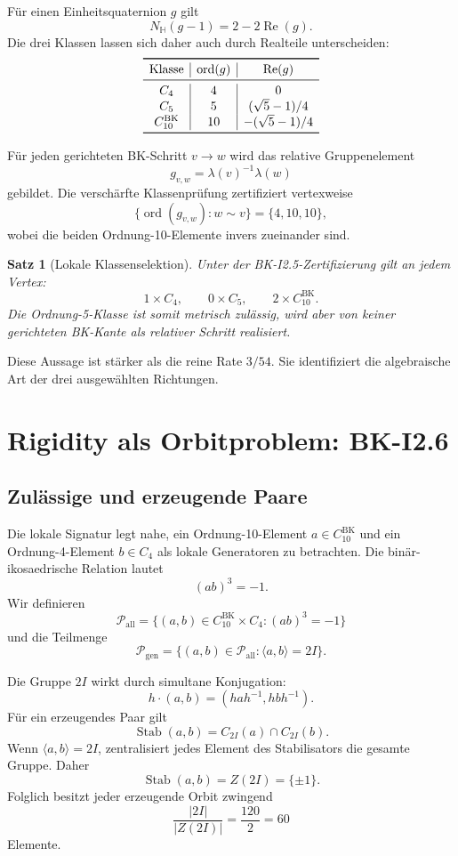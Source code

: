\documentclass[11pt,a4paper]{article}
\newtheorem{satz}{Satz}[section]
\theoremstyle{definition}
\newcommand{\twoI}{2I}
\newcommand{\Pgen}{\mathcal P_{\mathrm{gen}}}
\newcommand{\Pall}{\mathcal P_{\mathrm{all}}}
\begin{document}
Für einen Einheitsquaternion \(g\) gilt
\[
N_{\mathbb H}(g-1)=2-2\operatorname{Re}(g).
\]
Die drei Klassen lassen sich daher auch durch Realteile unterscheiden:
\[
\begin{array}{c|c|c}
\toprule
\text{Klasse} & \operatorname{ord}(g) & \operatorname{Re}(g)\\
\midrule
C_4 & 4 & 0\\
C_5 & 5 & (\sqrt5-1)/4\\
C_{10}^{\mathrm{BK}} & 10 & -(\sqrt5-1)/4\\
\bottomrule
\end{array}
\]

Für jeden gerichteten BK-Schritt \(v\to w\) wird das relative Gruppenelement
\[
g_{v,w}=\lambda(v)^{-1}\lambda(w)
\]
gebildet. Die verschärfte Klassenprüfung zertifiziert vertexweise
\[
\boxed{
\{\operatorname{ord}(g_{v,w}):w\sim v\}
=
\{4,10,10\},
}
\]
wobei die beiden Ordnung-10-Elemente invers zueinander sind.

\begin{satz}[Lokale Klassenselektion]
Unter der BK-I2.5-Zertifizierung gilt an jedem Vertex:
\[
1\times C_4,\qquad
0\times C_5,\qquad
2\times C_{10}^{\mathrm{BK}}.
\]
Die Ordnung-5-Klasse ist somit metrisch zulässig, wird aber von keiner gerichteten BK-Kante als relativer Schritt realisiert.
\end{satz}

Diese Aussage ist stärker als die reine Rate \(3/54\). Sie identifiziert die algebraische Art der drei ausgewählten Richtungen.

\section{Rigidity als Orbitproblem: BK-I2.6}

\subsection{Zulässige und erzeugende Paare}

Die lokale Signatur legt nahe, ein Ordnung-10-Element \(a\in C_{10}^{\mathrm{BK}}\) und ein Ordnung-4-Element \(b\in C_4\) als lokale Generatoren zu betrachten. Die binär-ikosaedrische Relation lautet
\[
(ab)^3=-1.
\]
Wir definieren
\[
\Pall=
\{(a,b)\in C_{10}^{\mathrm{BK}}\times C_4:(ab)^3=-1\}
\]
und die Teilmenge
\[
\Pgen=
\{(a,b)\in\Pall:\langle a,b\rangle=\twoI\}.
\]

Die Gruppe \(\twoI\) wirkt durch simultane Konjugation:
\[
h\cdot(a,b)
=
(hah^{-1},hbh^{-1}).
\]
Für ein erzeugendes Paar gilt
\[
\operatorname{Stab}(a,b)
=
C_{\twoI}(a)\cap C_{\twoI}(b).
\]
Wenn \(\langle a,b\rangle=\twoI\), zentralisiert jedes Element des Stabilisators die gesamte Gruppe. Daher
\[
\operatorname{Stab}(a,b)=Z(\twoI)=\{\pm1\}.
\]
Folglich besitzt jeder erzeugende Orbit zwingend
\[
\boxed{
\frac{|\twoI|}{|Z(\twoI)|}
=\frac{120}{2}
=60
}
\]
Elemente.
\end{document}
